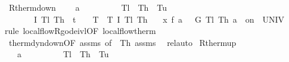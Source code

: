 \documentclass[envcountsame,envcountsect]{llncs}
\begin{document}
\begin{example}
\begin{isabellebody}
\isanewline
{}\isamarkupfalse%
\ R{\isacharunderscore}therm{\isacharunderscore}down{\isacharcolon}\ \isanewline
\ \ \ {\isachardoublequoteopen}a\ {\isachargreater}\ {}{\isachardoublequoteclose}\ \ {\isachardoublequoteopen}{}\ {\isasymle}\ {\isasymtau}{\isachardoublequoteclose}\ \ {\isachardoublequoteopen}{}\ {\isacharless}\ T\isactrlsub l{\isachardoublequoteclose}\ \ {\isachardoublequoteopen}T\isactrlsub h\ {\isacharless}\ T\isactrlsub u{\isachardoublequoteclose}\isanewline
\ \ \ {\isachardoublequoteopen}\isactrlbold {\isacharbrackleft}{\isasymtheta}\ {\isacharequal}\ {}\ {\isasymand}\ I\ T\isactrlsub l\ T\isactrlsub h\ {\isasymand}\ t\ {\isacharequal}\ {}\ {\isasymand}\ T\ {\isacharequal}\ T{\isacharcomma}\ I\ T\isactrlsub l\ T\isactrlsub h\isactrlbold {\isacharbrackright}\ {\isasymge}\isanewline 
\ \ {\isacharparenleft}x{\isasymacute}{\isacharequal}\ f\ a\ {}\ {\isacharampersand}\ G\ T\isactrlsub l\ T\isactrlsub h\ a\ {}\ on\ {\isacharbraceleft}{}{\isachardot}{\isachardot}{\isasymtau}{\isacharbraceright}\ UNIV\ {\isacharat}\ {}{\isacharparenright}{\isachardoublequoteclose}\isanewline
\ \ \isamarkupfalse%
{\isacharparenleft}rule\ local{\isacharunderscore}flow{\isachardot}R{\isacharunderscore}g{\isacharunderscore}ode{\isacharunderscore}ivl{\isacharbrackleft}OF\ local{\isacharunderscore}flow{\isacharunderscore}therm{\isacharbrackright}{\isacharparenright}\isanewline
\ \ \isamarkupfalse%
\ therm{\isacharunderscore}dyn{\isacharunderscore}down{\isacharbrackleft}OF\ assms{\isacharparenleft}{}{\isacharcomma}{}{\isacharparenright}{\isacharcomma}\ of\ {\isacharunderscore}\ T\isactrlsub h{\isacharbrackright}\ assms\ \isamarkupfalse%
\ rel{\isacharunderscore}auto{\isacharprime}%
\isanewline
\isanewline
{}\isamarkupfalse%
\ R{\isacharunderscore}therm{\isacharunderscore}up{\isacharcolon}\ \isanewline
\ \ \ {\isachardoublequoteopen}a\ {\isachargreater}\ {}{\isachardoublequoteclose}\ \ {\isachardoublequoteopen}{}\ {\isasymle}\ {\isasymtau}{\isachardoublequoteclose}\ \ {\isachardoublequoteopen}{}\ {\isacharless}\ T\isactrlsub l{\isachardoublequoteclose}\ \ {\isachardoublequoteopen}T\isactrlsub h\ {\isacharless}\ T\isactrlsub u{\isachardoublequoteclose}\isanewline

\end{isabellebody}
\end{example}
\end{document}
